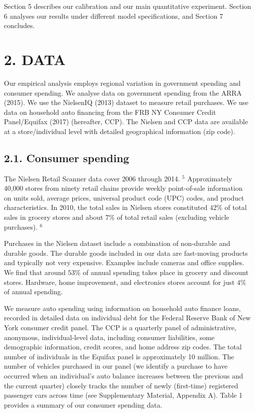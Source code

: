 \documentclass[10pt]{article}
\begin{document}
Section 5 describes our calibration and our main quantitative experiment. Section 6 analyses our results under different model specifications, and Section 7 concludes.

\section*{2. DATA}
Our empirical analysis employs regional variation in government spending and consumer spending. We analyse data on government spending from the ARRA (2015). We use the NielsenIQ (2013) dataset to measure retail purchases. We use data on household auto financing from the FRB NY Consumer Credit Panel/Equifax (2017) (hereafter, CCP). The Nielsen and CCP data are available at a store/individual level with detailed geographical information (zip code).

\subsection*{2.1. Consumer spending}
The Nielsen Retail Scanner data cover 2006 through 2014. ${ }^{5}$ Approximately 40,000 stores from ninety retail chains provide weekly point-of-sale information on units sold, average prices, universal product code (UPC) codes, and product characteristics. In 2010, the total sales in Nielsen stores constituted $42 \%$ of total sales in grocery stores and about $7 \%$ of total retail sales (excluding vehicle purchases). ${ }^{6}$

Purchases in the Nielsen dataset include a combination of non-durable and durable goods. The durable goods included in our data are fast-moving products and typically not very expensive. Examples include cameras and office supplies. We find that around $53 \%$ of annual spending takes place in grocery and discount stores. Hardware, home improvement, and electronics stores account for just $4 \%$ of annual spending.

We measure auto spending using information on household auto finance loans, recorded in detailed data on individual debt for the Federal Reserve Bank of New York consumer credit panel. The CCP is a quarterly panel of administrative, anonymous, individual-level data, including consumer liabilities, some demographic information, credit scores, and home address zip codes. The total number of individuals in the Equifax panel is approximately 10 million. The number of vehicles purchased in our panel (we identify a purchase to have occurred when an individual's auto balance increases between the previous and the current quarter) closely tracks the number of newly (first-time) registered passenger cars across time (see Supplementary Material, Appendix A). Table 1 provides a summary of our consumer spending data.
\end{document}
